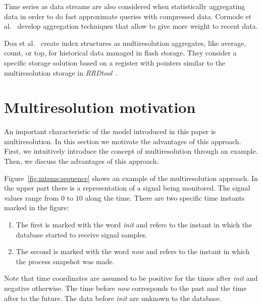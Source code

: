 Time series as data streams are also considered when statistically
aggregating data in order to do fast approximate queries with
compressed data. Cormode et al.~\cite{cormode08:pods} develop
aggregation techniques that allow to give more weight to recent
data.  

Dou et al.~\cite{dou14:historic_queries_flash_storage} create index
structures as multiresolution aggregates, like average, count, or top,
for historical data managed in flash storage. They consider a specific
storage solution based on a register with pointers similar to the
multiresolution storage in \emph{RRDtool}~\cite{lisa98:oetiker}.



\section{Multiresolution motivation}
\label{sec:features}

An important characteristic of the model introduced in this paper is
multiresolution. In this section we motivate the advantages of this
approach. First, we intuitively introduce the concept of
multiresolution through an example. Then, we discuss the advantages of
this approach.

Figure~\ref{fig:mtsms:sequence} shows an example of the
multiresolution approach. 
%
In the upper part there is a representation of a signal being
monitored. The signal values range from $0$ to $10$ along the
time. There are two specific time instants marked in the figure:
\begin{enumerate}
\item The first is marked with the word \emph{init} and refers to the
  instant in which the database started to receive signal samples.
\item The second is marked with the word \emph{now} and refers to the
  instant in which the process snapshot was made.
\end{enumerate}
Note that time coordinates are assumed to be positive for the times
after \emph{init} and negative otherwise. The time before \emph{now}
corresponds to the past and the time after to the future.
The data before \emph{init} are unknown to the database.

